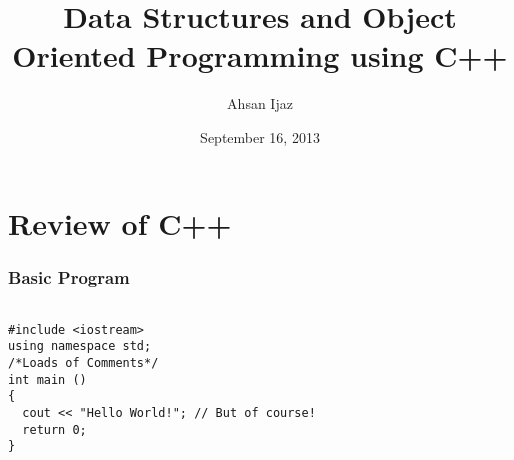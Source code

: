\documentclass{beamer}
\newtheorem{Key points}{Key points}
\newcommand\Fontvia{\fontsize{6}{7.2}\selectfont}
\begin{document}
\title[Lecture 3]{Data Structures and Object Oriented Programming using C++} 
\author[]{Ahsan Ijaz}
\date{September 16, 2013}
 \frame{\titlepage}
\section{Review of C++}

\begin{frame}[fragile]
\frametitle{Basic Program}
\begin{lstlisting}

#include <iostream>
using namespace std;
/*Loads of Comments*/
int main ()
{
  cout << "Hello World!"; // But of course! 
  return 0;
}
\end{lstlisting}
\end{frame}
\end{document}
